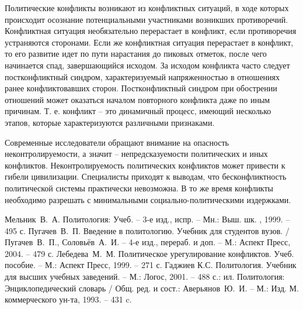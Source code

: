 Политические конфликты возникают из конфликтных ситуаций, в ходе которых
происходит осознание потенциальными участниками возникших противоречий.
Конфликтная ситуация необязательно перерастает в конфликт, если противоречия
устраняются сторонами. Если же конфликтная ситуация перерастает в конфликт, то
его развитие идет по пути нарастания до пиковых отметок, после чего начинается
спад, завершающийся исходом. За исходом конфликта часто следует постконфликтный
синдром, характеризуемый напряженностью в отношениях ранее конфликтовавших
сторон. Постконфликтный синдром при обострении отношений может оказаться
началом повторного конфликта даже по иным причинам. Т. е. конфликт -- это
динамичный процесс, имеющий несколько этапов, которые характеризуются
различными признаками.

Современные исследователи обращают внимание на опасность неконтролируемости, а
значит -- непредсказуемости политических и иных конфликтов. Неконтролируемость
политических конфликтов может привести к гибели цивилизации. Специалисты
приходят к выводам, что бесконфликтность политической системы практически
невозможна. В то же время конфликты необходимо разрешать с минимальными
социально-политическими издержками.

\newpage %
\renewcommand{\bibname}{Список литературы}

\begin{thebibliography}{9} 
     Мельник~В.~А. Политология: Учеб. -- 3-е изд., испр. -- Мн.:
    Выш. шк. , 1999. -- 495 с.
     Пугачев~В.~П. Введение в политологию. Учебник для студентов
    вузов. / Пугачев~В.~П., Соловьёв~А.~И. -- 4-е изд., перераб. и доп. -- М.:
    Аспект Пресс, 2004. -- 479 с.
     Лебедева~М.~М. Политическое урегулирование конфликтов. Учеб.
    пособие. -- М.: Аспект Пресс, 1999. -- 271 с.
     Гаджиев К.С. Политология. Учебник для высших учебных заведений.
    -- М.: Логос, 2001. -- 488 с.: ил.
     Политология: Энциклопедический словарь / Общ. ред. и сост.:
    Аверьянов~Ю.~И. -- М.: Изд. М. коммерческого ун-та, 1993. -- 431 c.
\end{thebibliography}